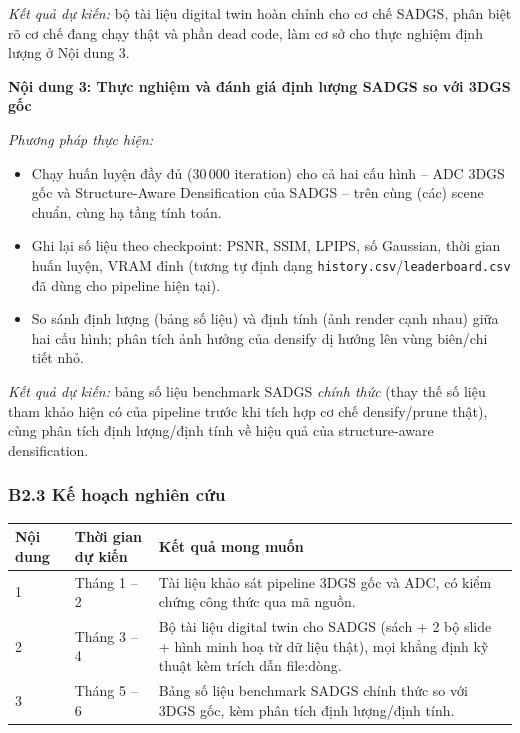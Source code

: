 \documentclass[a4paper,12pt]{article}
\begin{document}
\textit{Kết quả dự kiến:} bộ tài liệu digital twin hoàn chỉnh cho cơ chế SADGS, phân biệt rõ cơ
chế đang chạy thật và phần dead code, làm cơ sở cho thực nghiệm định lượng ở Nội dung 3.

\medskip
\textbf{Nội dung 3: Thực nghiệm và đánh giá định lượng SADGS so với 3DGS gốc}

\textit{Phương pháp thực hiện:}
\begin{itemize}[leftmargin=1.2em]
\item Chạy huấn luyện đầy đủ (30\,000 iteration) cho cả hai cấu hình -- ADC 3DGS gốc và
Structure-Aware Densification của SADGS -- trên cùng (các) scene chuẩn, cùng hạ tầng tính toán.
\item Ghi lại số liệu theo checkpoint: PSNR, SSIM, LPIPS, số Gaussian, thời gian huấn luyện, VRAM
đỉnh (tương tự định dạng \texttt{history.csv}/\texttt{leaderboard.csv} đã dùng cho pipeline hiện
tại).
\item So sánh định lượng (bảng số liệu) và định tính (ảnh render cạnh nhau) giữa hai cấu hình;
phân tích ảnh hưởng của densify dị hướng lên vùng biên/chi tiết nhỏ.
\end{itemize}

\textit{Kết quả dự kiến:} bảng số liệu benchmark SADGS \emph{chính thức} (thay thế số liệu tham
khảo hiện có của pipeline trước khi tích hợp cơ chế densify/prune thật), cùng phân tích định
lượng/định tính về hiệu quả của structure-aware densification.

\subsubsection*{B2.3 Kế hoạch nghiên cứu}

\begin{longtable}{@{}p{1.3cm} p{3.4cm} p{9.3cm}@{}}
\toprule
\textbf{Nội dung} & \textbf{Thời gian dự kiến} & \textbf{Kết quả mong muốn} \\
\midrule
\endhead
1 & Tháng 1 -- 2 & Tài liệu khảo sát pipeline 3DGS gốc và ADC, có kiểm chứng công thức qua mã
nguồn. \\
2 & Tháng 3 -- 4 & Bộ tài liệu digital twin cho SADGS (sách + 2 bộ slide + hình minh hoạ từ dữ
liệu thật), mọi khẳng định kỹ thuật kèm trích dẫn file:dòng. \\
3 & Tháng 5 -- 6 & Bảng số liệu benchmark SADGS chính thức so với 3DGS gốc, kèm phân tích định
lượng/định tính. \\
\bottomrule
\end{longtable}
\end{document}
